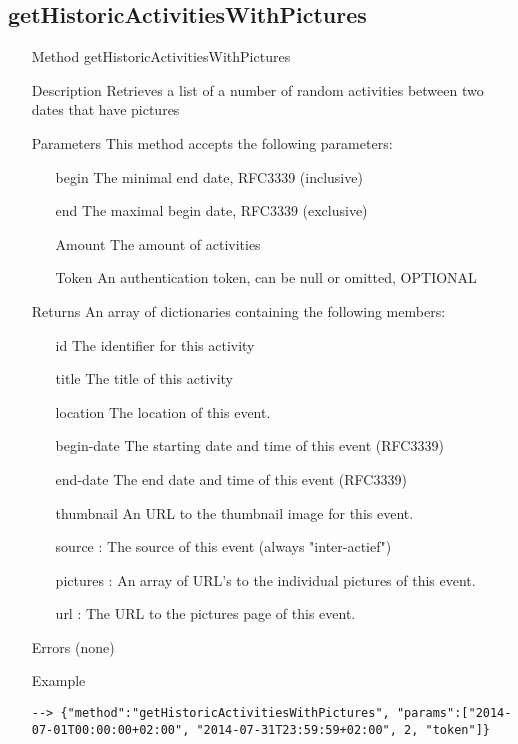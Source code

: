 \documentclass[a4paper]{scrreprt}
\begin{document}
\subsection{getHistoricActivitiesWithPictures}
\begin{enumerate}
\item[Method] getHistoricActivitiesWithPictures
\item[Description] Retrieves a list of a number of random activities between two dates that have pictures
\item[Parameters] This method accepts the following parameters:
    \begin{enumerate}
        \item[begin] The minimal end date, RFC3339 (inclusive)
        \item[end] The maximal begin date, RFC3339 (exclusive) 
        \item[Amount] The amount of activities
        \item[Token] An authentication token, can be null or omitted, OPTIONAL
    \end{enumerate}
\item[Returns] An array of dictionaries containing the following members:
\begin{enumerate}
    \item[id] The identifier for this activity
    \item[title] The title of this activity
    \item[location] The location of this event.
    \item[begin-date] The starting date and time of this event (RFC3339)
    \item[end-date] The end date and time of this event (RFC3339)
    \item[thumbnail] An URL to the thumbnail image for this event.
    \item[source]: The source of this event (always "inter-actief")
    \item[pictures]: An array of URL's to the individual pictures of this event.
    \item[url]: The URL to the pictures page of this event.
    \end{enumerate}
\item[Errors] (none)
\item[Example]
\begin{lstlisting}
--> {"method":"getHistoricActivitiesWithPictures", "params":["2014-07-01T00:00:00+02:00", "2014-07-31T23:59:59+02:00", 2, "token"]}
\end{lstlisting}
\end{enumerate}
\end{document}
